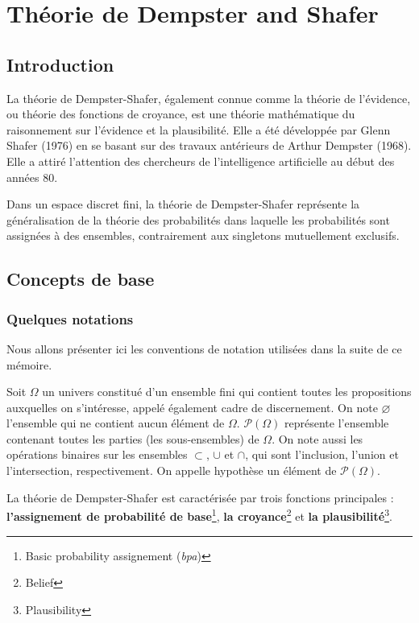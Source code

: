 \chapter{Théorie de Dempster and Shafer}

{}
\section*{Introduction}

La théorie de Dempster-Shafer, également connue comme la théorie de l'évidence,
ou théorie des fonctions de croyance, est une théorie mathématique du raisonnement
sur l’évidence et la plausibilité. Elle a été développée par Glenn Shafer (1976)
en se basant sur des travaux antérieurs de Arthur Dempster (1968). Elle a attiré
l’attention des chercheurs de l'intelligence artificielle au début des années 80.

Dans un espace discret fini, la théorie de Dempster-Shafer représente la généralisation
de la théorie des probabilités dans laquelle les probabilités sont assignées à des ensembles,
contrairement aux singletons mutuellement exclusifs.

\section{Concepts de base}

\subsection{Quelques notations}

Nous allons présenter ici les conventions de notation utilisées dans la suite de ce mémoire.

Soit $\Omega$ un univers constitué d'un ensemble fini qui contient toutes les propositions
auxquelles on s'intéresse, appelé également cadre de discernement. On note $\varnothing$
l’ensemble qui ne contient aucun élément de $\Omega$. $\mathcal{P}(\Omega)$ représente
l’ensemble contenant toutes les parties (les sous-ensembles) de $\Omega$. On note aussi
les opérations binaires sur les ensembles $\subset$, $\cup$ et $\cap$, qui sont l’inclusion,
l’union et l’intersection, respectivement. On appelle hypothèse un élément de $\mathcal{P}(\Omega)$.

La théorie de Dempster-Shafer est caractérisée par trois fonctions principales :
\textbf{l’assignement de probabilité de base}\footnote{Basic probability assignement (\emph{bpa})},
\textbf{la croyance}\footnote{Belief} et \textbf{la plausibilité}\footnote{Plausibility}.

